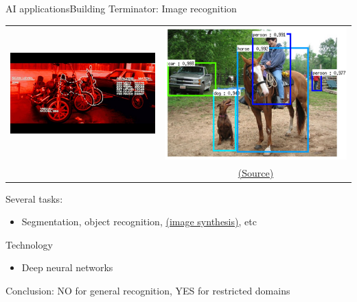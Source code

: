 \documentclass[10pt,compress]{beamer} %
\begin{document}
\begin{frame}{AI applications}{Building Terminator: Image recognition}
    \begin{table}
	\begin{tabular}{cc}
		\includegraphics[width=0.5\linewidth]{figs/segmentation.jpeg} & \includegraphics[width=0.4\linewidth]{figs/detection.png} \\ 
  	    & \tiny \href{https://joshua19881228.github.io/2017-06-13-An-Introduction-to-CNN-based-Object-Detection/}{(Source)}     \\ 
	\end{tabular}
    \end{table}
    
    \vspace{-0.5cm}

    \normalsize{
    Several tasks:
    \begin{itemize}
        \item Segmentation, object recognition, \href{https://thispersondoesnotexist.com/}{(image synthesis)}, etc
    \end{itemize}
    Technology
    \begin{itemize}
        \item Deep neural networks
    \end{itemize}
	Conclusion: NO for general recognition, YES for restricted domains
    }
\end{frame}
\end{document}
